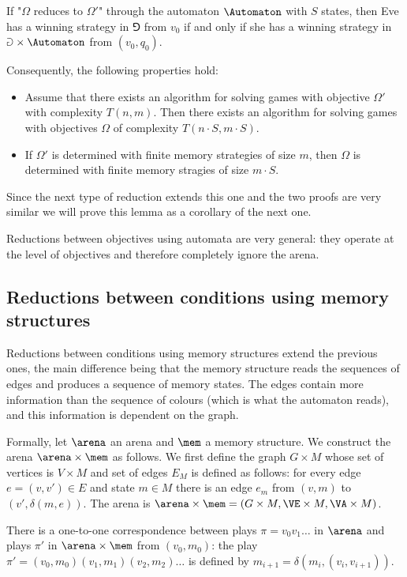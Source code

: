 \begin{lemma}
\label{1-lem:automata_reduction}
If "$\Omega$ reduces to $\Omega'$" through the automaton $\Automaton$ with $S$ states, then 
Eve has a winning strategy in $\Game$ from $v_0$ if and only if she has a winning strategy in $\Game \times \Automaton$ from $(v_0,q_0)$.

Consequently, the following properties hold:
\begin{itemize}
	\item Assume that there exists an algorithm for solving games with objective $\Omega'$ with complexity $T(n,m)$. 
	Then there exists an algorithm for solving games with objectives $\Omega$ of complexity $T(n \cdot S, m \cdot S)$.

	\item If $\Omega'$ is determined with finite memory strategies of size $m$, then $\Omega$ is determined with finite memory stragies of size $m \cdot S$.
\end{itemize}
\end{lemma}
Since the next type of reduction extends this one and the two proofs are very similar we will prove this lemma as a corollary of the next one.

Reductions between objectives using automata are very general: 
they operate at the level of objectives and therefore completely ignore the arena.

\subsection*{Reductions between conditions using memory structures}
Reductions between conditions using memory structures extend the previous ones, the main difference being that 
the memory structure reads the sequences of edges and produces a sequence of memory states.
The edges contain more information than the sequence of colours (which is what the automaton reads), 
and this information is dependent on the graph.

Formally, let $\arena$ an arena and $\mem$ a memory structure.
We construct the arena $\arena \times \mem$ as follows.
We first define the graph $G \times M$ whose set of vertices is $V \times M$ and set of edges $E_M$ is defined as follows:
for every edge $e = (v,v') \in E$ and state $m \in M$ there is an edge $e_m$ from $(v,m)$ to $(v',\delta(m,e))$.
The arena is $\arena \times \mem = (G \times M, \VE \times M, \VA \times M)$.

\begin{fact}
\label{1-fact:strategies_memory}
There is a one-to-one correspondence between plays $\pi = v_0 v_1 \dots$ in $\arena$ 
and plays $\pi'$ in $\arena \times \mem$ from $(v_0,m_0)$:
the play $\pi' = (v_0, m_0) (v_1, m_1) (v_2, m_2) \ldots$
is defined by $m_{i+1} = \delta(m_i, (v_{i},v_{i+1}))$.
\end{fact}

